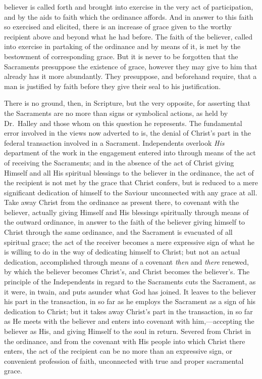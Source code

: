 \documentclass[
  english,
]{book}
\begin{document}
believer is called forth and brought into exercise in the very act of participation, and by the aids to faith which the ordinance affords. And in answer to this faith so exercised and elicited, there is an increase of grace given to the worthy recipient above and beyond what he had before. The faith of the believer, called into exercise in partaking of the ordinance and by means of it, is met by the bestowment of corresponding grace. But it is never to be forgotten that the Sacraments presuppose the existence of grace, however they may give to him that already has it more abundantly. They presuppose, and beforehand require, that a man is justified by faith before they give their seal to his justification.

There is no ground, then, in Scripture, but the very opposite, for asserting that the Sacraments are no more than signs or symbolical actions, as held by Dr.~Halley and those whom on this question he represents. The fundamental error involved in the views now adverted to is, the denial of Christ's part in the federal transaction involved in a Sacrament. Independents overlook \emph{His} department of the work in the engagement entered into through means of the act of receiving the Sacraments; and in the absence of the act of Christ giving Himself and all His spiritual blessings to the believer in the ordinance, the act of the recipient is not met by the grace that Christ confers, but is reduced to a mere significant dedication of himself to the Saviour unconnected with any grace at all. Take away Christ from the ordinance as present there, to covenant with the believer, actually giving Himself and His blessings spiritually through means of the outward ordinance, in answer to the faith of the believer giving himself to Christ through the same ordinance, and the Sacrament is evacuated of all spiritual grace; the act of the receiver becomes a mere expressive sign of what he is willing to do in the way of dedicating himself to Christ; but not an actual dedication, accomplished through means of a covenant \emph{then} and \emph{there} renewed, by which the believer becomes Christ's, and Christ becomes the believer's. The principle of the Independents in regard to the Sacraments cuts the Sacrament, as it were, in twain, and puts asunder what God has joined. It leaves to the believer his part in the transaction, in so far as he employs the Sacrament as a sign of his dedication to Christ; but it takes away Christ's part in the transaction, in so far as He meets with the believer and enters into covenant with him,---accepting the believer as His, and giving Himself to the soul in return. Severed from Christ in the ordinance, and from the covenant with His people into which Christ there enters, the act of the recipient can be no more than an expressive sign, or convenient profession of faith, unconnected with true and proper sacramental grace.
\end{document}
